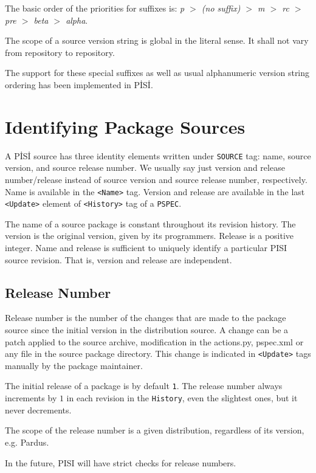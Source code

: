 \documentclass[a4paper,11pt]{article}
\begin{document}
The basic order of the priorities for suffixes is:\newline
\emph{p $>$ (no suffix) $>$ m $>$ rc $>$ pre $>$ beta $>$ alpha}.

The scope of a source version string is global in the literal
sense. It shall not vary from repository to repository.

The support for these special suffixes as well as usual alphanumeric
version string ordering has been implemented in P\.IS\.I.

\section{Identifying Package Sources}

A P\.IS\.I source has three identity elements written under
\texttt{SOURCE} tag: name, source version, and source release number.
We usually say just version and release number/release instead of
source version and source release number, respectively. Name is available in
the \texttt{<Name>} tag. Version and release are available in the last
\texttt{<Update>} element of \texttt{<History>} tag of a \texttt{PSPEC}.

The name of a source package is constant throughout its revision
history. The version is the original version, given by its
programmers. Release is a positive integer.  Name and release 
is sufficient to uniquely identify a particular PISI source revision.
That is, version and release are independent.

\subsection{Release Number}

Release number is the number of the changes that are made to the
package source since the initial version in the distribution source. A
change can be a patch applied to the source archive, modification in
the actions.py, pspec.xml or any file in the source package
directory. This change is indicated in \texttt{<Update>} tags manually
by the package maintainer.

The initial release of a package is by default \texttt{1}. The release
number always increments by $1$ in each revision in the
\texttt{History}, even the slightest ones, but it never decrements.

The scope of the release number is a given distribution, regardless of
its version, e.g. Pardus.

In the future, PISI will have strict checks for release numbers.
\end{document}
